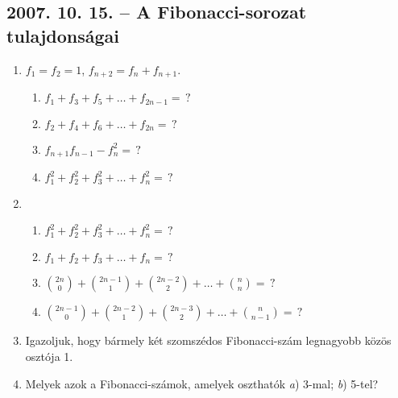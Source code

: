 \documentclass{article}
\newenvironment{abc}{\begin{enumerate}[label=\textit{\alph*})]}{\end{enumerate}}
\begin{document}
\subsection*{2007. 10. 15. -- A Fibonacci-sorozat tulajdonságai}
\begin{enumerate}
\item $f_1=f_2=1$, $f_{n+2}=f_n+f_{n+1}$.
\begin{abc}
\item $\displaystyle{f_1+f_3+f_5+\ldots+f_{2n-1}}=\,?$
\item $\displaystyle{f_2+f_4+f_6+\ldots+f_{2n}}=\,?$
\item $\displaystyle{f_{n+1}f_{n-1}-f_n^2}=\,?$
\item $\displaystyle{f_1^2+f_2^2+f_3^2+\ldots+f_n^2}=\,?$
\end{abc}
\item 
\begin{abc}
\item $\displaystyle{f_1^2+f_2^2+f_3^2+\ldots+f_n^2}=\,?$
\item $\displaystyle{f_1+f_2+f_3+\ldots+f_n}=\,?$
\item $\displaystyle{\binom{2n}{0}+\binom{2n-1}{1}+\binom{2n-2}{2}+\ldots+\binom{n}{n}}=\,?$
\item $\displaystyle{\binom{2n-1}{0}+\binom{2n-2}{1}+\binom{2n-3}{2}+\ldots+\binom{n}{n-1}}=\,?$
\end{abc}
\item Igazoljuk, hogy bármely két szomszédos Fibonacci-szám legnagyobb közös osztója 1.
\item Melyek azok a Fibonacci-számok, amelyek oszthatók \textit{a}) 3-mal; \textit{b}) 5-tel?
\end{enumerate}
\end{document}
